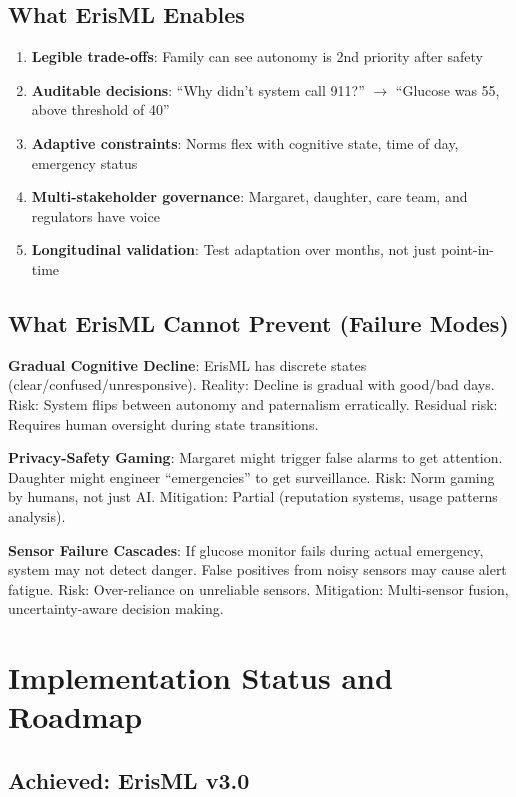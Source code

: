 \documentclass[conference]{IEEEtran}
\begin{document}
\subsection{What ErisML Enables}

\begin{enumerate}
\item \textbf{Legible trade-offs}: Family can see autonomy is 2nd priority after safety
\item \textbf{Auditable decisions}: ``Why didn't system call 911?'' $\to$ ``Glucose was 55, above threshold of 40''
\item \textbf{Adaptive constraints}: Norms flex with cognitive state, time of day, emergency status
\item \textbf{Multi-stakeholder governance}: Margaret, daughter, care team, and regulators have voice
\item \textbf{Longitudinal validation}: Test adaptation over months, not just point-in-time
\end{enumerate}

\subsection{What ErisML Cannot Prevent (Failure Modes)}

\textbf{Gradual Cognitive Decline}: ErisML has discrete states
(clear/confused/unresponsive). Reality: Decline is gradual with
good/bad days. Risk: System flips between autonomy and paternalism
erratically. Residual risk: Requires human oversight during state
transitions.

\textbf{Privacy-Safety Gaming}: Margaret might trigger false alarms to
get attention. Daughter might engineer ``emergencies'' to get
surveillance. Risk: Norm gaming by humans, not just AI. Mitigation:
Partial (reputation systems, usage patterns analysis).

\textbf{Sensor Failure Cascades}: If glucose monitor fails during
actual emergency, system may not detect danger. False positives from
noisy sensors may cause alert fatigue. Risk: Over-reliance on
unreliable sensors. Mitigation: Multi-sensor fusion, uncertainty-aware
decision making.

\section{Implementation Status and Roadmap}
\label{sec:roadmap}

\subsection{Achieved: ErisML v3.0}
\end{document}

